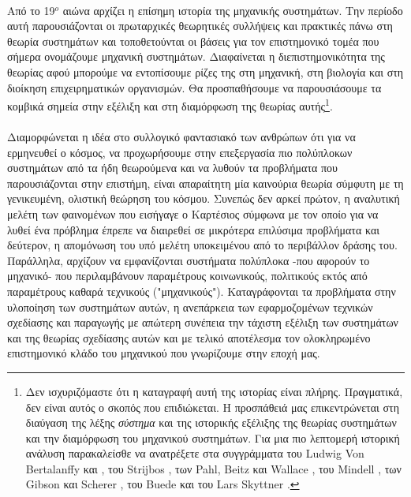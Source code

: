 \documentclass[a4paper,12pt,twoside]{report}
\begin{document}
{			\paragraph{}{Από το 19$^{ο}$ αιώνα αρχίζει η επίσημη ιστορία της μηχανικής συστημάτων. Την περίοδο αυτή παρουσιάζονται οι πρωταρχικές θεωρητικές συλλήψεις και πρακτικές πάνω στη θεωρία συστημάτων και τοποθετούνται οι βάσεις για τον επιστημονικό τομέα που σήμερα ονομάζουμε μηχανική συστημάτων. Διαφαίνεται η διεπιστημονικότητα της θεωρίας αφού μπορούμε να εντοπίσουμε ρίζες της στη μηχανική, στη βιολογία και στη διοίκηση επιχειρηματικών οργανισμών. Θα προσπαθήσουμε να παρουσιάσουμε τα κομβικά σημεία στην εξέλιξη και στη διαμόρφωση της θεωρίας αυτής\footnote{Δεν ισχυριζόμαστε ότι η καταγραφή αυτή της ιστορίας είναι πλήρης. Πραγματικά, δεν είναι αυτός ο σκοπός που επιδιώκεται. Η προσπάθειά μας επικεντρώνεται στη διαύγαση της λέξης \textit{σύστημα} και της ιστορικής εξέλιξης της θεωρίας συστημάτων και την διαμόρφωση του μηχανικού συστημάτων. Για μια πιο λεπτομερή ιστορική ανάλυση παρακαλείσθε να ανατρέξετε στα συγγράμματα του Ludwig Von Bertalanffy \cite{TheHistoryΑndStatusΟfGeneralSystemsTheory:Bertalanffy} και \cite[κεφάλαιο: εισαγωγή]{GeneralSystemsTheory:Bertalanffy1972}, του Strijbos \cite{SystemsThinking:STRIJBOS2010}, των Pahl, Beitz και Wallace \cite[νότητα 1.1.2]{EngineeringDesignASystematicApproach:Pahl1996}, του Mindell \cite{HistoricalPerspectivesOnSystemsThinkingInEngineering}, των Gibson και Scherer \cite[ενότητα 1.8]{HowToDoSystemAnalysis:Gibson2007}, του Buede \cite{EngineeringDesignOfSystemsModelsAndMethods:Buede2011} και του Lars Skyttner \cite{GeneralSystemsTheory:Skyttner2005}.}.
			}

			\paragraph{}{Διαμορφώνεται η ιδέα στο συλλογικό φαντασιακό των ανθρώπων ότι για να ερμηνευθεί ο κόσμος, να προχωρήσουμε στην επεξεργασία πιο πολύπλοκων συστημάτων από τα ήδη θεωρούμενα και να λυθούν τα προβλήματα που παρουσιάζονται στην επιστήμη, είναι απαραίτητη μία καινούρια θεωρία σύμφυτη με τη γενικευμένη, ολιστική θεώρηση του κόσμου. Συνεπώς δεν αρκεί πρώτον, η αναλυτική μελέτη των φαινομένων που εισήγαγε ο Καρτέσιος σύμφωνα με τον οποίο για να λυθεί ένα πρόβλημα έπρεπε να διαιρεθεί σε μικρότερα επιλύσιμα προβλήματα και δεύτερον, η απομόνωση του υπό μελέτη υποκειμένου από το περιβάλλον δράσης του. Παράλληλα, αρχίζουν να εμφανίζονται συστήματα πολύπλοκα -που αφορούν το μηχανικό- που περιλαμβάνουν παραμέτρους κοινωνικούς, πολιτικούς εκτός από παραμέτρους καθαρά τεχνικούς ("μηχανικούς"). Καταγράφονται τα προβλήματα στην υλοποίηση των συστημάτων αυτών, η ανεπάρκεια των εφαρμοζομένων τεχνικών σχεδίασης και παραγωγής με απώτερη συνέπεια την τάχιστη εξέλιξη των συστημάτων και της θεωρίας σχεδίασης αυτών και με τελικό αποτέλεσμα τον ολοκληρωμένο επιστημονικό κλάδο του μηχανικού που γνωρίζουμε στην εποχή μας.
			}
}
\end{document}
